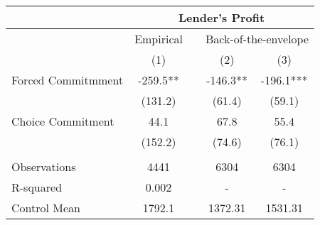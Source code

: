 \begin{tabular}{lcccc}
\toprule
      & \multicolumn{4}{c}{Lender's Profit} \\
\midrule
      & Empirical  &       & \multicolumn{2}{c}{Back-of-the-envelope} \\
\cmidrule{2-2}\cmidrule{4-5}      & (1)   &       & (2)   & (3) \\
\midrule
\midrule
Forced Commitmment & -259.5** &       & -146.3** & -196.1*** \\
      & (131.2) &       & (61.4) & (59.1) \\
Choice Commitment & 44.1  &       & 67.8  & 55.4 \\
      & (152.2) &       & (74.6) & (76.1) \\
      &       &       &       &  \\
\midrule
Observations & 4441  &       & 6304  & 6304 \\
R-squared & 0.002 &       & -     & - \\
Control Mean & 1792.1 &       & 1372.31 & 1531.31 \\
\bottomrule
\bottomrule
\end{tabular}%

